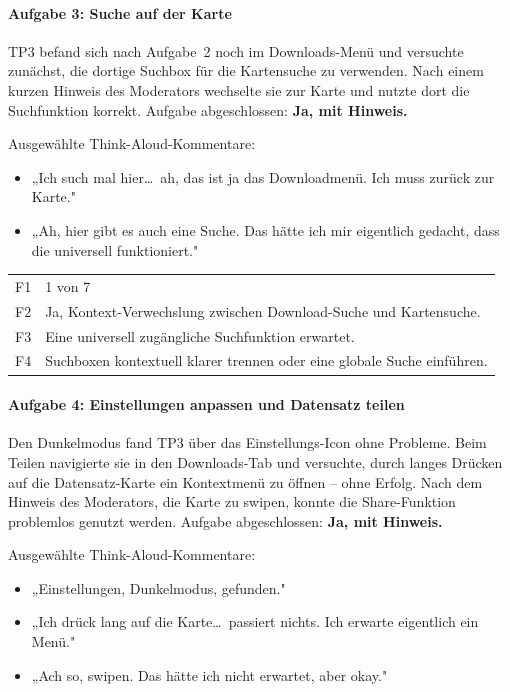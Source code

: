 \documentclass{article}
\begin{document}
\paragraph{Aufgabe 3: Suche auf der Karte}

TP3 befand sich nach Aufgabe~2 noch im Downloads-Menü und versuchte
zunächst, die dortige Suchbox für die Kartensuche zu verwenden.
Nach einem kurzen Hinweis des Moderators wechselte sie zur Karte und
nutzte dort die Suchfunktion korrekt.
Aufgabe abgeschlossen: \textbf{Ja, mit Hinweis.}

Ausgewählte Think-Aloud-Kommentare:
\begin{itemize}
  \item „Ich such mal hier\ldots\ ah, das ist ja das Downloadmenü.
        Ich muss zurück zur Karte."
  \item „Ah, hier gibt es auch eine Suche. Das hätte ich mir eigentlich
        gedacht, dass die universell funktioniert."
\end{itemize}

\begin{tabular}{@{}lp{10cm}@{}}
  F1 & 1 von 7 \\
  F2 & Ja, Kontext-Verwechslung zwischen Download-Suche und Kartensuche. \\
  F3 & Eine universell zugängliche Suchfunktion erwartet. \\
  F4 & Suchboxen kontextuell klarer trennen oder eine globale Suche
       einführen. \\
\end{tabular}

\paragraph{Aufgabe 4: Einstellungen anpassen und Datensatz teilen}

Den Dunkelmodus fand TP3 über das Einstellungs-Icon ohne Probleme.
Beim Teilen navigierte sie in den Downloads-Tab und versuchte, durch
langes Drücken auf die Datensatz-Karte ein Kontextmenü zu öffnen –
ohne Erfolg. Nach dem Hinweis des Moderators, die Karte zu swipen,
konnte die Share-Funktion problemlos genutzt werden.
Aufgabe abgeschlossen: \textbf{Ja, mit Hinweis.}

Ausgewählte Think-Aloud-Kommentare:
\begin{itemize}
  \item „Einstellungen, Dunkelmodus, gefunden."
  \item „Ich drück lang auf die Karte\ldots\ passiert nichts.
        Ich erwarte eigentlich ein Menü."
  \item „Ach so, swipen. Das hätte ich nicht erwartet, aber okay."
\end{itemize}
\end{document}
